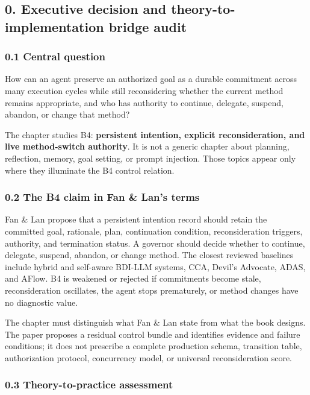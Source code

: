 \subsection{0. Executive decision and theory-to-implementation bridge audit}\label{executive-decision-and-theory-to-implementation-bridge-audit}

\subsubsection{0.1 Central question}\label{central-question}

How can an agent preserve an authorized goal as a durable commitment across many execution cycles while still reconsidering whether the current method remains appropriate, and who has authority to continue, delegate, suspend, abandon, or change that method?

The chapter studies B4: \textbf{persistent intention, explicit reconsideration, and live method-switch authority}. It is not a generic chapter about planning, reflection, memory, goal setting, or prompt injection. Those topics appear only where they illuminate the B4 control relation.

\subsubsection{0.2 The B4 claim in Fan \& Lan's terms}\label{the-b4-claim-in-fan-lans-terms}

Fan \& Lan propose that a persistent intention record should retain the committed goal, rationale, plan, continuation condition, reconsideration triggers, authority, and termination status. A governor should decide whether to continue, delegate, suspend, abandon, or change method. The closest reviewed baselines include hybrid and self-aware BDI-LLM systems, CCA, Devil's Advocate, ADAS, and AFlow. B4 is weakened or rejected if commitments become stale, reconsideration oscillates, the agent stops prematurely, or method changes have no diagnostic value.

The chapter must distinguish what Fan \& Lan state from what the book designs. The paper proposes a residual control bundle and identifies evidence and failure conditions; it does not prescribe a complete production schema, transition table, authorization protocol, concurrency model, or universal reconsideration score.

\subsubsection{0.3 Theory-to-practice assessment}\label{theory-to-practice-assessment}

